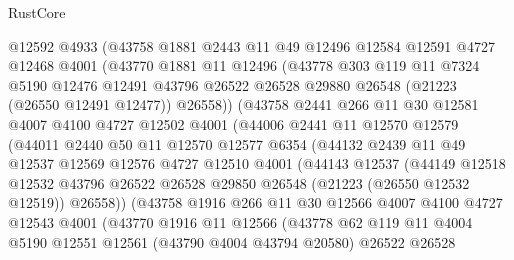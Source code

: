 \begin{lexlean}{RustCore}
\begin{coremodule}
          @12592
          @4933
          (@43758
            @1881
            @2443
            @11
            @49
            @12496
            @12584
            @12591
            @4727
            @12468
            @4001
            (@43770
              @1881
              @11
              @12496
              (@43778
                @303
                @119
                @11
                @7324
                @5190
                @12476
                @12491
                @43796
                @26522
                @26528
                @29880
                @26548
                (@21223 (@26550 @12491 @12477))
                @26558))
            (@43758
              @2441
              @266
              @11
              @30
              @12581
              @4007
              @4100
              @4727
              @12502
              @4001
              (@44006
                @2441
                @11
                @12570
                @12579
                (@44011
                  @2440
                  @50
                  @11
                  @12570
                  @12577
                  @6354
                  (@44132
                    @2439
                    @11
                    @49
                    @12537
                    @12569
                    @12576
                    @4727
                    @12510
                    @4001
                    (@44143
                      @12537
                      (@44149
                        @12518
                        @12532
                        @43796
                        @26522
                        @26528
                        @29850
                        @26548
                        (@21223 (@26550 @12532 @12519))
                        @26558))
                    (@43758
                      @1916
                      @266
                      @11
                      @30
                      @12566
                      @4007
                      @4100
                      @4727
                      @12543
                      @4001
                      (@43770
                        @1916
                        @11
                        @12566
                        (@43778
                          @62
                          @119
                          @11
                          @4004
                          @5190
                          @12551
                          @12561
                          (@43790 @4004 @43794 @20580)
                          @26522
                          @26528

\end{coremodule}
\end{lexlean}

